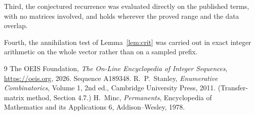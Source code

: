 \documentclass[11pt,a4paper]{article}
\theoremstyle{plain}
\theoremstyle{definition}
\begin{document}
Third, the conjectured recurrence was evaluated directly on the published terms, with no
matrices involved, and holds wherever the proved range and the data overlap.

Fourth, the annihilation test of Lemma~\ref{lem:crit} was carried out in exact integer
arithmetic on the whole vector rather than on a sampled prefix.

\begin{thebibliography}{9}
 The OEIS Foundation, \emph{The On-Line Encyclopedia of Integer
Sequences}, \url{https://oeis.org}, 2026. Sequence A189348.
 R.~P.~Stanley, \emph{Enumerative Combinatorics}, Volume 1, 2nd ed.,
Cambridge University Press, 2011. (Transfer-matrix method, Section 4.7.)
 H.~Minc, \emph{Permanents}, Encyclopedia of Mathematics and its
Applications 6, Addison--Wesley, 1978.
\end{thebibliography}
\end{document}
